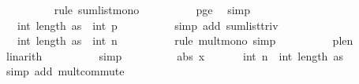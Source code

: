 \begin{isabellebody}
\ \ \ \ \ \ \ \ \isamarkupfalse%
\ {\isacharparenleft}{\kern0pt}rule\ sum{\isacharunderscore}{\kern0pt}list{\isacharunderscore}{\kern0pt}mono{\isacharparenright}{\kern0pt}\isanewline
\ \ \ \ \ \ \ \ \isamarkupfalse%
\ p{\isacharunderscore}{\kern0pt}ge{\isacharunderscore}{\kern0pt}{}\ \isamarkupfalse%
\ simp\ \isanewline
\ \ \ \ \ \ \isamarkupfalse%
\ \isamarkupfalse%
\ {\isachardoublequoteopen}{\isachardot}{\kern0pt}{\isachardot}{\kern0pt}{\isachardot}{\kern0pt}\ {\isacharequal}{\kern0pt}\ int\ {\isacharparenleft}{\kern0pt}length\ as{\isacharparenright}{\kern0pt}\ {\isacharasterisk}{\kern0pt}\ {\isacharparenleft}{\kern0pt}int\ p{\isacharplus}{\kern0pt}{}{\isacharparenright}{\kern0pt}{\isachardoublequoteclose}\isanewline
\ \ \ \ \ \ \ \ \isamarkupfalse%
\ {\isacharparenleft}{\kern0pt}simp\ add{\isacharcolon}{\kern0pt}\ sum{\isacharunderscore}{\kern0pt}list{\isacharunderscore}{\kern0pt}triv{\isacharparenright}{\kern0pt}\isanewline
\ \ \ \ \ \ \isamarkupfalse%
\ \isamarkupfalse%
\ {\isachardoublequoteopen}{\isachardot}{\kern0pt}{\isachardot}{\kern0pt}{\isachardot}{\kern0pt}\ {\isasymle}\ int\ {\isacharparenleft}{\kern0pt}length\ as{\isacharparenright}{\kern0pt}\ {\isacharasterisk}{\kern0pt}\ {\isacharparenleft}{\kern0pt}{}{\isacharplus}{\kern0pt}{}{\isacharasterisk}{\kern0pt}{\isacharparenleft}{\kern0pt}int\ n{\isacharparenright}{\kern0pt}{\isacharparenright}{\kern0pt}{\isachardoublequoteclose}\isanewline
\ \ \ \ \ \ \ \ \isamarkupfalse%
\ {\isacharparenleft}{\kern0pt}rule\ mult{\isacharunderscore}{\kern0pt}mono{\isacharcomma}{\kern0pt}\ simp{\isacharparenright}{\kern0pt}\isanewline
\ \ \ \ \ \ \ \ \isamarkupfalse%
\ p{\isacharunderscore}{\kern0pt}le{\isacharunderscore}{\kern0pt}n\ \isamarkupfalse%
\ linarith\isanewline
\ \ \ \ \ \ \ \ \isamarkupfalse%
\ simp{\isacharplus}{\kern0pt}\isanewline
\ \ \ \ \ \ \isamarkupfalse%
\ \isamarkupfalse%
\ {\isachardoublequoteopen}abs\ x\ {\isasymle}\ \ {\isacharparenleft}{\kern0pt}{}\ {\isacharplus}{\kern0pt}\ {}\ {\isacharasterisk}{\kern0pt}\ int\ n{\isacharparenright}{\kern0pt}\ {\isacharasterisk}{\kern0pt}\ int\ {\isacharparenleft}{\kern0pt}length\ as{\isacharparenright}{\kern0pt}{\isachardoublequoteclose}\isanewline
\ \ \ \ \ \ \ \ \isamarkupfalse%
\ {\isacharparenleft}{\kern0pt}simp\ add{\isacharcolon}{\kern0pt}\ mult{\isachardot}{\kern0pt}commute{\isacharparenright}{\kern0pt}\isanewline

\end{isabellebody}
